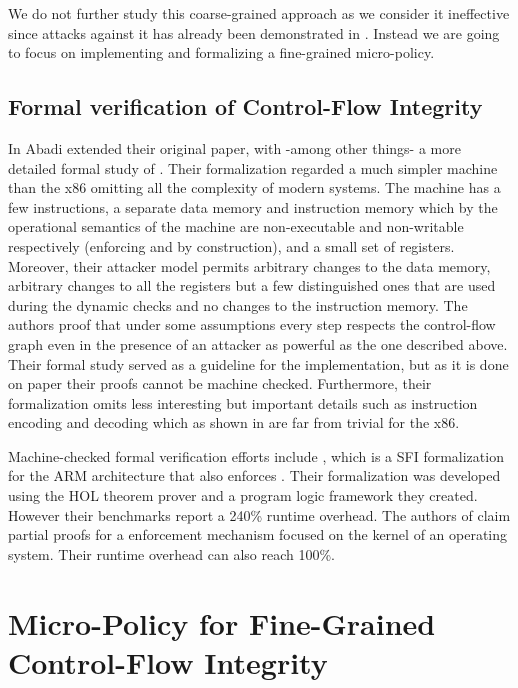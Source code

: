 We do not further study this coarse-grained approach as we consider it
ineffective since attacks against it has already been demonstrated in
\cite{outofcontrol_ieeesp2014}. Instead we are going to focus on
implementing and formalizing a fine-grained \CFI micro-policy.


\subsection{Formal verification of Control-Flow Integrity}\label{sec:cfi_verif}

In \cite{AbadiBEL09} Abadi \ETAL extended their original paper, with
-among other things- a more detailed formal study of \CFI. Their
formalization regarded a much simpler machine than the x86 omitting
all the complexity of modern systems. The machine has a few
instructions, a separate data memory and instruction memory which by
the operational semantics of the machine are non-executable and
non-writable respectively (enforcing \NXD and \NWC by construction),
and a small set of registers. Moreover, their attacker model permits
arbitrary changes to the data memory, arbitrary changes to all the
registers but a few distinguished ones that are used during the
dynamic checks and no changes to the instruction memory.  The authors
proof that under some assumptions every step respects the control-flow
graph even in the presence of an attacker as powerful as the one
described above. Their formal study served as a guideline for the
implementation, but as it is done on paper their proofs cannot be
machine checked. Furthermore, their formalization omits less
interesting but important details such as instruction encoding and
decoding which as shown in \cite{MorrisettTTTG12} are far from trivial
for the x86.

Machine-checked formal verification efforts include \cite{ZhaoLSR11},
which is a SFI formalization for the ARM architecture that also
enforces \CFI. Their formalization was developed using the HOL
theorem prover and a program logic framework they created. However
their benchmarks report a 240\% runtime overhead. The authors of
\cite{CriswellDA14} claim partial proofs for a \CFI enforcement
mechanism focused on the kernel of an operating system. Their runtime
overhead can also reach 100\%.

\section{Micro-Policy for Fine-Grained Control-Flow Integrity}
\label{sec:cfi_fine}

